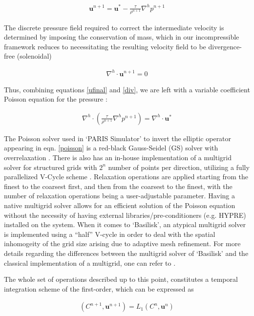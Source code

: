 \begin{align}
\boldsymbol{u}^{n+1} = \boldsymbol{u}^{*} - \frac{\tau}{\rho^{n+1}}\nabla^{h}p^{n+1}
\label{ufinal}
\end{align}

The discrete pressure field required to correct the intermediate velocity 
is determined by imposing the conservation of mass, which in our incompressible 
framework reduces to necessitating the resulting velocity field to be divergence-free (solenoidal)  

\begin{align}
\nabla^{h}\cdot\boldsymbol{u}^{n+1} = 0
\label{div}
\end{align}

Thus, combining equations \ref{ufinal} and \ref{div}, 
we are left with a variable coefficient Poisson equation for the pressure :  

\begin{align}
\nabla^{h}\cdot\left(\frac{\tau}{\rho^{n+1}}\nabla^{h}p^{n+1}\right) = \nabla^{h}\cdot \boldsymbol{u}^{*} 
	\label{poisson}
\end{align}

The Poisson solver used in `PARIS Simulator' to invert the elliptic operator 
appearing in eqn. \ref{poisson} is a red-black 
Gauss-Seidel (GS) solver with overrelaxation . 
There is also has an in-house implementation of a multigrid solver 
for structured grids with $2^{n}$ number of points per direction, 
utilizing a fully parallelized V-Cycle scheme \cite{briggs1987}. 
Relaxation operations are applied starting from the finest to the coarsest first, 
and then from the coarsest to the finest, with the number of relaxation operations 
being a user-adjustable parameter. Having a native multigrid solver allows 
for an efficient solution of the Poisson equation without the necessity
of having external libraries/pre-conditioners (e.g. HYPRE) installed on the system.
When it comes to `Basilisk', an atypical multigrid solver is implemented using 
a ``half'' V-cycle in order to deal with the spatial inhomogeity of the grid size
arising due to adaptive mesh refinement. 
For more details regarding the differences between the multigrid solver of `Basilisk'
and the classical implementation of a multigrid, one can refer to .


The whole set of operations described up to this point, 
constitutes a temporal integration scheme of the first-order, which can be expressed as 

\begin{align}
\left(C^{n+1},\boldsymbol{u}^{n+1}\right) = L_{1}\left( C^{n},\boldsymbol{u}^{n} \right)
\end{align}

